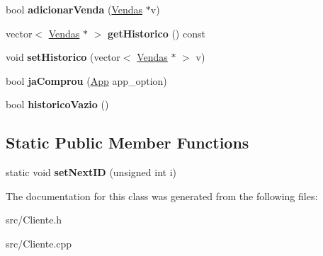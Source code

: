 \begin{DoxyCompactItemize}
\item 
\hypertarget{class_cliente_a56fd118de07cc418426f5f54c3f4935f}{bool {\bfseries adicionar\+Venda} (\hyperlink{class_vendas}{Vendas} $\ast$v)}\label{class_cliente_a56fd118de07cc418426f5f54c3f4935f}

\item 
\hypertarget{class_cliente_ad2d27cf5a6a187c6a5faa4fee88cfd9f}{vector$<$ \hyperlink{class_vendas}{Vendas} $\ast$ $>$ {\bfseries get\+Historico} () const }\label{class_cliente_ad2d27cf5a6a187c6a5faa4fee88cfd9f}

\item 
\hypertarget{class_cliente_a340b3c4b25009f1020984743eb371208}{void {\bfseries set\+Historico} (vector$<$ \hyperlink{class_vendas}{Vendas} $\ast$ $>$ v)}\label{class_cliente_a340b3c4b25009f1020984743eb371208}

\item 
\hypertarget{class_cliente_a452fdbf8832d1f7dd89a76b876aed67d}{bool {\bfseries ja\+Comprou} (\hyperlink{class_app}{App} app\+\_\+option)}\label{class_cliente_a452fdbf8832d1f7dd89a76b876aed67d}

\item 
\hypertarget{class_cliente_ab3e8ad3e04c826799a307d1a50f38fb8}{bool {\bfseries historico\+Vazio} ()}\label{class_cliente_ab3e8ad3e04c826799a307d1a50f38fb8}

\end{DoxyCompactItemize}
\subsection*{Static Public Member Functions}
\begin{DoxyCompactItemize}
\item 
\hypertarget{class_cliente_a072628868d4165e0b7915d975621bc8a}{static void {\bfseries set\+Next\+I\+D} (unsigned int i)}\label{class_cliente_a072628868d4165e0b7915d975621bc8a}

\end{DoxyCompactItemize}


The documentation for this class was generated from the following files\+:\begin{DoxyCompactItemize}
\item 
src/Cliente.\+h\item 
src/Cliente.\+cpp\end{DoxyCompactItemize}
